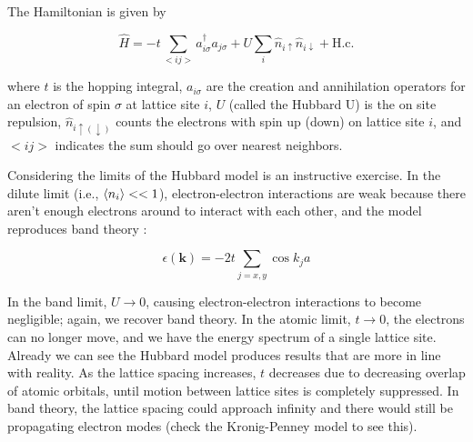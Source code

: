 The Hamiltonian is given by \cite{Atland2010}

\begin{equation}
\hat{H} = -t \sum_{<ij>} a^{\dagger}_{i \sigma} a_{j \sigma} + U \sum_{i} \hat{n}_{i \uparrow} \hat{n}_{i \downarrow} + \text{H.c.}
\end{equation}

where $t$ is the hopping integral, $a_{i \sigma}$ are the creation and annihilation operators for an electron of spin $\sigma$ at lattice site $i$, $U$ (called the Hubbard U) is the on site repulsion, $\hat{n}_{i\uparrow(\downarrow)}$ counts the electrons with spin up (down) on lattice site $i$, and $<ij>$ indicates the sum should go over nearest neighbors.

Considering the limits of the Hubbard model is an instructive exercise. In the dilute limit (i.e., $\braket{n_{i}} << 1$), electron-electron interactions are weak because there aren't enough electrons around to interact with each other, and the model reproduces band theory \cite{Fazekas1990}:

\begin{equation}
\epsilon(\mathbf{k}) = -2t \sum_{j = x,y} \cos{k_{j} a}
\end{equation}

In the band limit, $U \rightarrow 0$, causing electron-electron interactions to become negligible; again, we recover band theory. In the atomic limit, $t \rightarrow 0$, the electrons can no longer move, and we have the energy spectrum of a single lattice site. Already we can see the Hubbard model produces results that are more in line with reality. As the lattice spacing increases, $t$ decreases due to decreasing overlap of atomic orbitals, until motion between lattice sites is completely suppressed. In band theory, the lattice spacing could approach infinity and there would still be propagating electron modes (check the Kronig-Penney model to see this).

